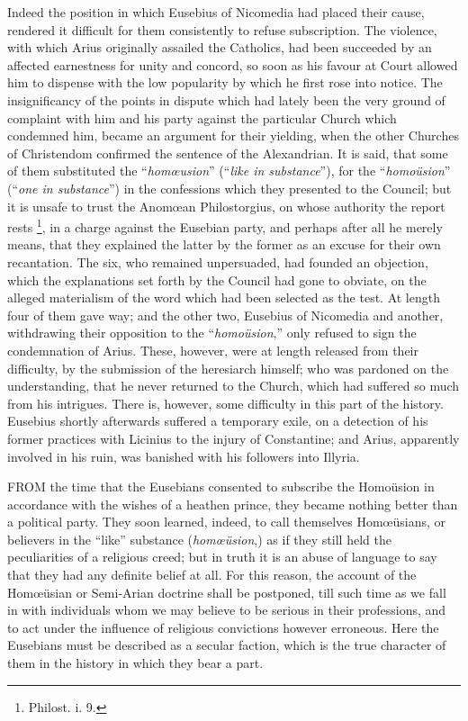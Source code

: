 Indeed the position in which Eusebius of Nicomedia had placed their
cause, rendered it difficult for them consistently to refuse
subscription. The violence, with which Arius originally assailed the
Catholics, had been succeeded by an affected earnestness for unity and
concord, so soon as his favour at Court allowed him to dispense with
the low popularity by which he first rose into notice. The
insignificancy of the points in dispute which had lately been
the very ground of complaint with him and his party against the
particular Church which condemned him, became an argument for their
yielding, when the other Churches of Christendom confirmed the
sentence of the Alexandrian. It is said, that some of them substituted
the ``\emph{homœusion}'' (``\emph{like in substance}''),
for the ``\emph{homoüsion}'' (``\emph{one in substance}'')
in the confessions which they presented to the Council; but it is
unsafe to trust the Anomœan Philostorgius, on whose authority the
report rests \footnote{Philost. i. 9.}, in a
charge against the Eusebian party, and perhaps after all he merely
means, that they explained the latter by the former as an excuse for
their own recantation. The six, who remained unpersuaded, had founded
an objection, which the explanations set forth by the Council had gone
to obviate, on the alleged materialism of the word which had been
selected as the test. At length four of them gave way; and the other
two, Eusebius of Nicomedia and another, withdrawing their opposition
to the ``\emph{homoüsion},'' only refused to sign the
condemnation of Arius. These, however, were at length released from
their difficulty, by the submission of the heresiarch himself; who was
pardoned on the understanding, that he never returned to the Church,
which had suffered so much from his intrigues. There is, however, some
difficulty in this part of the history. Eusebius shortly afterwards
suffered a temporary exile, on a detection of his former practices
with Licinius to the injury of Constantine; and Arius, apparently
involved in his ruin, was banished with his followers into Illyria.


FROM the time that the Eusebians
consented to subscribe the Homoüsion in accordance with the wishes of
a heathen prince, they became nothing better than a political party.
They soon learned, indeed, to call themselves Homœüsians, or
believers in the ``like'' substance (\emph{homœüsion},) as
if they still held the peculiarities of a religious creed; but in
truth it is an abuse of language to say that they had any definite
belief at all. For this reason, the account of the Homœüsian or
Semi-Arian doctrine shall be postponed, till such time as we fall in
with individuals whom we may believe to be serious in their
professions, and to act under the influence of religious convictions
however erroneous. Here the Eusebians must be described as a secular
faction, which is the true character of them in the history in which
they bear a part.

